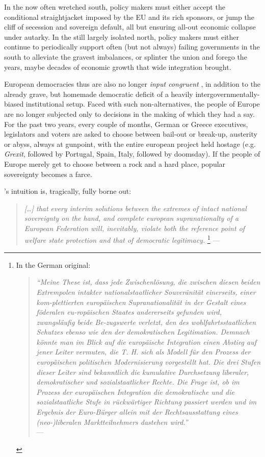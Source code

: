 \documentclass[11pt,a4paper,oneside,openright]{article}
\begin{document}
In the now often wretched south, policy makers must either accept the conditional straightjacket imposed by the \gls{EU} and its rich sponsors, or jump the cliff of secession and sovereign default, all but ensuring all-out economic collapse under autarky. 
In the still largely isolated north, policy makers must either continue to periodically support often (but not always) failing governments in the south to alleviate the gravest imbalances, or splinter the union and forego the years, maybe decades of economic growth that wide integration brought.

European democracies thus are also no longer \emph{input congruent} \citep{Zurn-2000-aa}, in addition to the already grave, but homemade democratic deficit of a heavily intergovernmentally-biased institutional setup. 
Faced with such non-alternatives, the people of Europe are no longer subjected only to decisions in the making of which they had a say. 
For the past two years, every couple of months, German or Greece executives, legislators and voters are asked to choose between bail-out or break-up, austerity or abyss, always at gunpoint, with the entire european project held hostage (e.g. \emph{Grexit}, followed by Portugal, Spain, Italy, followed by doomsday). 
If the people of Europe merely get to choose between a rock and a hard place, popular sovereignty becomes a farce.

\citeauthor{Offe1998}'s \citeyear{Offe1998} intuition is, tragically, fully borne out:	
\begin{quote}
	\emph{[\ldots] that every interim solutions between the extremes of intact national sovereignty on the hand, and complete european supranationalty of a European Federation will, inevitably, violate both the reference point of welfare state protection and that of democratic legitimacy.}
	\footnote{\label{fn:Offe-regress}
		In the German original:\\
		\begin{quote}
			\emph{``Meine These ist, dass jede Zwischenl\"{o}sung, die zwischen diesen beiden Extrempolen intakter nationalstaatlicher Souver\"{a}nit\"{a}t einerseits, einer kom-plettierten europ\"{a}ischen Supranationalität in der Gestalt eines föderalen eu-ropäischen Staates andererseits gefunden wird, zwangsl\"{a}ufig beide Be-zugswerte verletzt, den des wohlfahrtsstaatlichen Schutzes ebenso wie den der demokratischen Legitimation. 
			Demnach k\"{o}nnte man im Blick auf die europäische Integration einen Abstieg auf jener Leiter vermuten, die T. H. \cite{Marshall-1950-aa} sich als Modell für den Prozess der europ\"{a}ischen politischen Modernisierung vorgestellt hat. 
			Die drei Stufen dieser Leiter sind bekanntlich die kumulative Durchsetzung liberaler, demokratischer und sozialstaatlicher Rechte. 
			Die Frage ist, ob im Prozess der europäischen Integration die demokratische und die sozialstaatliche Stufe in r\"{u}ckw\"{a}rtiger Richtung passiert werden und im Ergebnis der Euro-B\"{u}rger allein mit der Rechtsausstattung eines (neo-)liberalen Marktteilnehmers dastehen wird.''}\\
			--- \cite[41]{Offe1998}\\
		\end{quote}
	}
	--- \cite[41]{Offe1998}
\end{quote}
\end{document}
